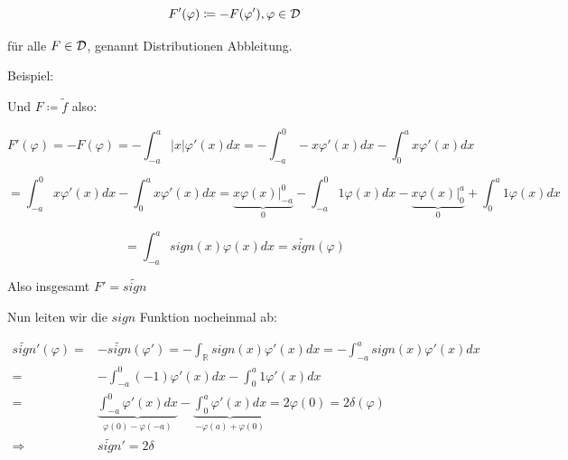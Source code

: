 \documentclass{article}
\theoremstyle{plain}
\theoremstyle{definition}
\numberwithin{equation}{section}
\newcommand{\abs}[1] {
\left| #1 \right|
}
\newcommand{\R}[0] {
\mathbb R
}
\begin{document}
\begin{equation}\label{eq.11.2}
    F'(\varphi) \coloneqq -F(\varphi'), \varphi \in \mathcal{D}
\end{equation}

für alle $F\in \mathcal{D}$, genannt Distributionen Abbleitung.

Beispiel:

\begin{center}
\end{center}
Und $F \coloneqq \tilde f$ also:

\[F'(\varphi) = -F(\varphi) = - \int_{-a}^a \abs{x} \varphi'(x) dx = - \int_{-a}^0 -x \varphi'(x) dx - \int_0^a x \varphi'(x) dx \]

\[= \int_{-a}^0 x \varphi'(x) dx - \int_0^a x \varphi'(x) dx = \underbrace{x \varphi(x)|_{-a}^0}_{0} - \int_{-a}^0 1 \varphi(x) dx - \underbrace{x \varphi(x)|_0^a}_{0} + \int_0^a 1 \varphi(x) dx\]

\[= \int_{-a}^a sign(x) \varphi(x) dx = \tilde{sign}(\varphi)\]

\begin{center}
\end{center}

Also insgesamt $F'=\tilde{sign}$

Nun leiten wir die $sign$ Funktion nocheinmal ab:

\begin{align*}
    \tilde{sign}'(\varphi) =& -\tilde{sign}(\varphi') = - \int_\R sign(x) \varphi'(x) dx = - \int_{-a}^a sign(x) \varphi'(x) dx\\
    =&- \int_{-a}^0 (-1) \varphi'(x) dx - \int_0^a 1 \varphi'(x)dx\\
    =&\underbrace{\int_{-a}^0 \varphi'(x) dx}_{\varphi(0) - \varphi(-a)} - \underbrace{\int_0^a \varphi'(x)dx}_{-\varphi(a)+\varphi(0)} = 2 \varphi(0) = 2 \delta(\varphi)\\
    \Rightarrow & \tilde{sign}'=2\delta
\end{align*}
\end{document}
